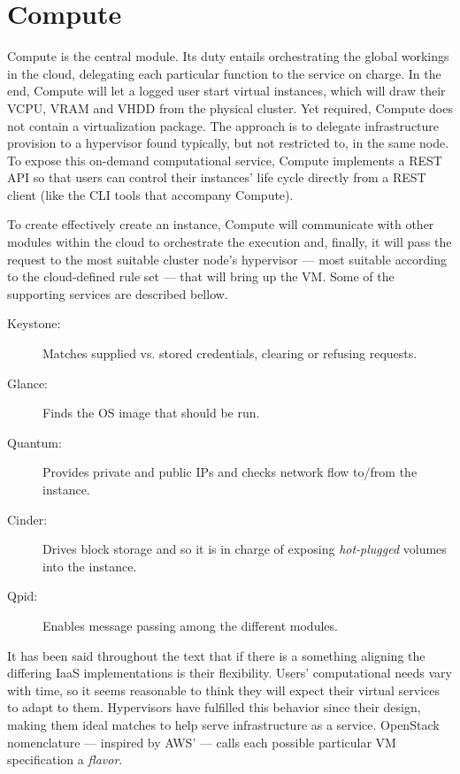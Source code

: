 \section{Compute}\label{sec:compute}

\noindent Compute is the central module. Its duty entails orchestrating the global workings in the cloud, delegating each particular function to the service on charge. In the end, Compute will let a logged user start virtual instances, which will draw their VCPU, VRAM and VHDD from the physical cluster. Yet required, Compute does not contain a virtualization package. The approach is to delegate infrastructure provision to a hypervisor found typically, but not restricted to, in the same node. To expose this on-demand computational service, Compute implements a REST API so that users can control their instances' life cycle directly from a REST client (like the CLI tools that accompany Compute).

To create effectively create an instance, Compute will communicate with other modules within the cloud to orchestrate the execution and, finally, it will pass the request to the most suitable cluster node's hypervisor --- most suitable according to the cloud-defined rule set --- that will bring up the VM. Some of the supporting services are described bellow.

\begin{description}
 \item[Keystone:] Matches supplied vs. stored credentials, clearing or refusing requests.
 \item[Glance:] Finds the OS image that should be run.
 \item[Quantum:] Provides private and public IPs and checks network flow to/from the instance.
 \item[Cinder:] Drives block storage and so it is in charge of exposing \emph{hot-plugged} volumes into the instance.
 \item[Qpid:] Enables message passing among the different modules.
\end{description}

It has been said throughout the text that if there is a something aligning the differing IaaS implementations is their flexibility. Users' computational needs vary with time, so it seems reasonable to think they will expect their virtual services to adapt to them. Hypervisors have fulfilled this behavior since their design, making them ideal matches to help serve infrastructure as a service. OpenStack nomenclature --- inspired by AWS' --- calls each possible particular VM specification a \emph{flavor}.

